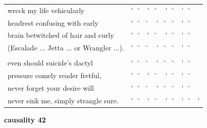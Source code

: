 \documentclass[12pt, landscape]{article}
\begin{document}
\begin{center}
\begin{tabularx}{\textwidth}{
>{\lefting\arraybackslash}X
c
c
c
c
c
c
c
c
c
}

wreck my life vehicularly & \'{} & \u{} & \'{} & \u{} & \'{} & \u{} & \'{} & \u{} & \\
headrest confusing with early & \'{} & \u{} & \u{} & \'{} & \u{} & \u{} & \'{} & \u{} & \\
brain betwitched of hair and curly & \'{} & \u{} & \'{} & \u{} & \'{} & \u{} & \'{} & \u{} & \\
(Escalade ... Jetta ... or Wrangler ...). & \'{} & \u{} & \u{} & \'{} & \u{} & \u{} & \'{} & \u{} & \\
 & & & & & & & & \\
even should suicide's dactyl & \'{} & \u{} & \u{} & \'{} & \u{} & \u{} & \'{} & \u{} & \\
pressure comely reader fretful, & \'{} & \u{} & \'{} & \u{} & \'{} & \u{} & \'{} & \u{} & \\
never forget your desire will & \'{} & \u{} & \u{} & \'{} & \u{} & \u{} & \'{} & \u{} & \\
never sink me, simply strangle sure. & \'{} & \u{} & \'{} & \u{} & \'{} & \u{} & \'{} & \u{} & \'{} \\

\end{tabularx}
\end{center}

\vspace*{\fill}

\newpage

\vspace*{\fill}

\noindent \textbf{causality 42}
\noindent \hfill \par
\end{document}
